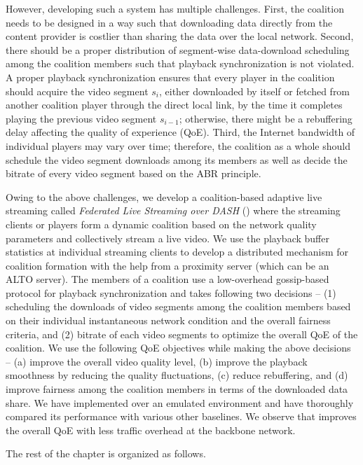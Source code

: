 However, developing such a system has multiple challenges. First, the coalition needs to be designed in a way such that downloading data directly from the content provider is costlier than sharing the data over the local network. Second, there should be a proper distribution of segment-wise data-download scheduling among the coalition members such that playback synchronization is not violated. A proper playback synchronization ensures that every player in the coalition should acquire the video segment $s_{i}$, either downloaded by itself or fetched from another coalition player through the direct local link, by the time it completes playing the previous video segment $s_{i-1}$; otherwise, there might be a rebuffering delay affecting the quality of experience (QoE). Third, the Internet bandwidth of individual players may vary over time; therefore, the coalition as a whole should schedule the video segment downloads among its members as well as decide the bitrate of every video segment based on the ABR principle.

Owing to the above challenges, we develop a coalition-based adaptive live streaming  called \textit{Federated Live Streaming over DASH} (\our) where the streaming clients or players form a dynamic coalition based on the network quality parameters and collectively stream a live video. We use the playback buffer statistics at individual streaming clients to develop a distributed mechanism for coalition formation with the help from a proximity server (which can be an ALTO server). The members of a coalition use a low-overhead gossip-based protocol for playback synchronization and takes following two decisions -- (1) scheduling the downloads of video segments among the coalition members based on their individual instantaneous network condition and the overall fairness criteria, and (2) bitrate of each video segments to optimize the overall QoE of the coalition. We use the following QoE objectives while making the above decisions -- (a) improve the overall video quality level, (b) improve the playback smoothness by reducing the quality fluctuations, (c) reduce rebuffering, and (d) improve fairness  among the coalition members in terms of the downloaded data share. We have implemented {\our} over an emulated environment and have thoroughly compared its performance with various other baselines. We observe that {\our} improves the overall QoE with less traffic overhead at the backbone network.

The rest of the chapter is organized as follows. 
